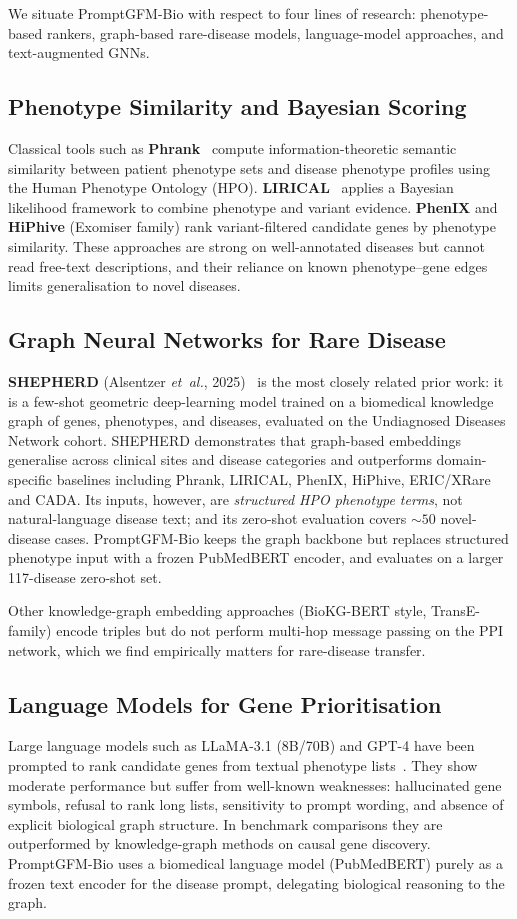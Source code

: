 \documentclass[conference]{IEEEtran}
\begin{document}
We situate PromptGFM-Bio with respect to four lines of research: phenotype-based rankers, graph-based rare-disease models, language-model approaches, and text-augmented GNNs.

\subsection{Phenotype Similarity and Bayesian Scoring}
Classical tools such as \textbf{Phrank}~\cite{jagadeesh2019phrank} compute information-theoretic semantic similarity between patient phenotype sets and disease phenotype profiles using the Human Phenotype Ontology (HPO). \textbf{LIRICAL}~\cite{robinson2020lirical} applies a Bayesian likelihood framework to combine phenotype and variant evidence. \textbf{PhenIX} and \textbf{HiPhive} (Exomiser family) rank variant-filtered candidate genes by phenotype similarity. These approaches are strong on well-annotated diseases but cannot read free-text descriptions, and their reliance on known phenotype--gene edges limits generalisation to novel diseases.

\subsection{Graph Neural Networks for Rare Disease}
\textbf{SHEPHERD} (Alsentzer \emph{et~al.}, 2025)~\cite{shepherd2025} is the most closely related prior work: it is a few-shot geometric deep-learning model trained on a biomedical knowledge graph of genes, phenotypes, and diseases, evaluated on the Undiagnosed Diseases Network cohort. SHEPHERD demonstrates that graph-based embeddings generalise across clinical sites and disease categories and outperforms domain-specific baselines including Phrank, LIRICAL, PhenIX, HiPhive, ERIC/XRare and CADA. Its inputs, however, are \emph{structured HPO phenotype terms}, not natural-language disease text; and its zero-shot evaluation covers $\sim\!\!50$ novel-disease cases. PromptGFM-Bio keeps the graph backbone but replaces structured phenotype input with a frozen PubMedBERT encoder, and evaluates on a larger 117-disease zero-shot set.

Other knowledge-graph embedding approaches (BioKG-BERT style, TransE-family) encode triples but do not perform multi-hop message passing on the PPI network, which we find empirically matters for rare-disease transfer.

\subsection{Language Models for Gene Prioritisation}
Large language models such as LLaMA-3.1 (8B/70B) and GPT-4 have been prompted to rank candidate genes from textual phenotype lists~\cite{shepherd2025}. They show moderate performance but suffer from well-known weaknesses: hallucinated gene symbols, refusal to rank long lists, sensitivity to prompt wording, and absence of explicit biological graph structure. In benchmark comparisons they are outperformed by knowledge-graph methods on causal gene discovery. PromptGFM-Bio uses a biomedical language model (PubMedBERT) purely as a frozen text encoder for the disease prompt, delegating biological reasoning to the graph.
\end{document}
